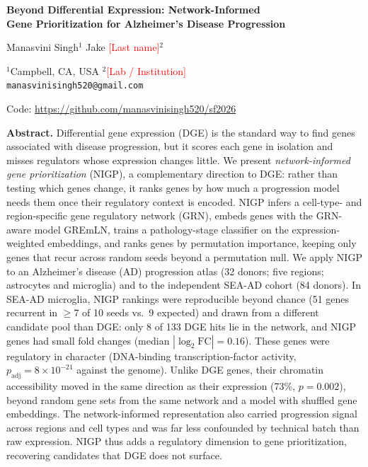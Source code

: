 \documentclass[10pt,twocolumn,letterpaper]{article}
\newcommand{\todo}[1]{\textcolor{red}{[#1]}}
\begin{document}
\onecolumn
\thispagestyle{empty}
\begin{center}
{\LARGE\bfseries Beyond Differential Expression: Network-Informed\\[2pt] Gene Prioritization for Alzheimer's Disease Progression\par}
\vspace{14pt}
{\large Manasvini Singh$^{1}$ \quad Jake \todo{Last name}$^{2}$\par}
\vspace{6pt}
{\small $^{1}$Campbell, CA, USA \quad $^{2}$\todo{Lab / Institution}\\
\texttt{manasvinisingh520@gmail.com}\par}
\vspace{6pt}
{\small Code: \url{https://github.com/manasvinisingh520/sf2026}\par}
\end{center}
\vspace{10pt}
\noindent\textbf{Abstract.}
Differential gene expression (DGE) is the standard way to find genes associated with disease progression, but it scores each gene in isolation and misses regulators whose expression changes little. We present \emph{network-informed gene prioritization} (NIGP), a complementary direction to DGE: rather than testing which genes change, it ranks genes by how much a progression model needs them once their regulatory context is encoded. NIGP infers a cell-type- and region-specific gene regulatory network (GRN), embeds genes with the GRN-aware model GREmLN, trains a pathology-stage classifier on the expression-weighted embeddings, and ranks genes by permutation importance, keeping only genes that recur across random seeds beyond a permutation null. We apply NIGP to an Alzheimer's disease (AD) progression atlas (32 donors; five regions; astrocytes and microglia) and to the independent SEA-AD cohort (84 donors). In SEA-AD microglia, NIGP rankings were reproducible beyond chance (51 genes recurrent in $\geq$7 of 10 seeds vs.\ 9 expected) and drawn from a different candidate pool than DGE: only 8 of 133 DGE hits lie in the network, and NIGP genes had small fold changes (median $|\log_2\text{FC}|=0.16$). These genes were regulatory in character (DNA-binding transcription-factor activity, $p_{\text{adj}}=8\times10^{-21}$ against the genome). Unlike DGE genes, their chromatin accessibility moved in the same direction as their expression (73\%, $p=0.002$), beyond random gene sets from the same network and a model with shuffled gene embeddings. The network-informed representation also carried progression signal across regions and cell types and was far less confounded by technical batch than raw expression. NIGP thus adds a regulatory dimension to gene prioritization, recovering candidates that DGE does not surface.
\end{document}
